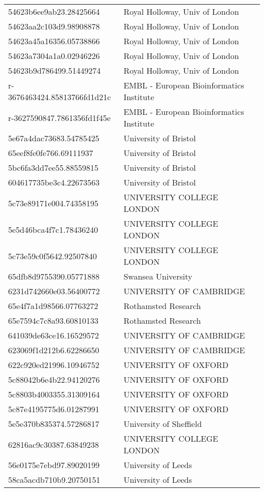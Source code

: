 \begin{tabular}{ll}
54623b6ee9ab23.28425664 & Royal Holloway, Univ of London \\
54623aa2c103d9.98908878 & Royal Holloway, Univ of London \\
54623a45a16356.05738866 & Royal Holloway, Univ of London \\
54623a7304a1a0.02946226 & Royal Holloway, Univ of London \\
54623b9d786499.51449274 & Royal Holloway, Univ of London \\
r-3676463424.85813766fd1d21c & EMBL - European Bioinformatics Institute \\
r-3627590847.7861356fd1f45e & EMBL - European Bioinformatics Institute \\
5e67a4dac73683.54785425 & University of Bristol \\
65eef8fe0fe766.69111937 & University of Bristol \\
5bc6fa3dd7ee55.88559815 & University of Bristol \\
604617735be3c4.22673563 & University of Bristol \\
5c73e89171e004.74358195 & UNIVERSITY COLLEGE LONDON \\
5e5d46bca4f7c1.78436240 & UNIVERSITY COLLEGE LONDON \\
5c73e59c0f5642.92507840 & UNIVERSITY COLLEGE LONDON \\
65dfb8d9755390.05771888 & Swansea University \\
6231d742660e03.56400772 & UNIVERSITY OF CAMBRIDGE \\
65e4f7a1d98566.07763272 & Rothamsted Research \\
65e7594c7c8a93.60810133 & Rothamsted Research \\
641039de63ce16.16529572 & UNIVERSITY OF CAMBRIDGE \\
623069f1d212b6.62286650 & UNIVERSITY OF CAMBRIDGE \\
622c920ed21996.10946752 & UNIVERSITY OF OXFORD \\
5c88042b6e4b22.94120276 & UNIVERSITY OF OXFORD \\
5c8803b4003355.31309164 & UNIVERSITY OF OXFORD \\
5c87e4195775d6.01287991 & UNIVERSITY OF OXFORD \\
5e5e370b835374.57286817 & University of Sheffield \\
62816ac9c30387.63849238 & UNIVERSITY COLLEGE LONDON \\
56e0175e7ebd97.89020199 & University of Leeds \\
58ca5acdb710b9.20750151 & University of Leeds \\

\end{tabular}
